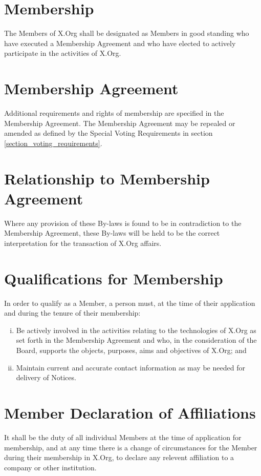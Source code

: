 \documentclass[10pt, english]{bylaws}
\begin{document}

\section{Membership}
The Members of X.Org shall be designated as Members in good standing who have
executed a Membership Agreement and who have elected to actively participate in
the activities of X.Org.

\section{Membership Agreement}
Additional requirements and rights of membership are specified in the Membership
Agreement. The Membership Agreement may be repealed or amended as defined by
the Special Voting Requirements in section \ref{section_voting_requirements}.

\section{Relationship to Membership Agreement}
Where any provision of these By-laws is found to be in contradiction to the
Membership Agreement, these By-laws will be held to be the correct
interpretation for the transaction of X.Org affairs.

\section{Qualifications for Membership}
In order to qualify as a Member, a person must, at the time of their application
and during the tenure of their membership:

\begin{enumerate}[(i)\hspace{.2cm}]
	\item Be actively involved in the activities relating to the technologies
	of X.Org as set forth in the Membership Agreement and who, in the
	consideration of the Board, supports the objects, purposes, aims
	and objectives of X.Org; and

	\item Maintain current and accurate contact information as may be needed
	for delivery of Notices.
\end{enumerate}

\section{Member Declaration of Affiliations}
It shall be the duty of all individual Members at the time of application for
membership, and at any time there is a change of circumstances for the Member
during their membership in X.Org, to declare any relevent affiliation to a
company or other institution.
\end{document}
